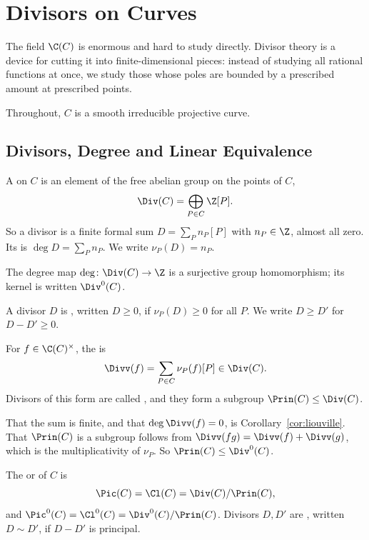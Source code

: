 \section{Divisors on Curves}\label{sec:divisors}

The field $\C(C)$ is enormous and hard to study directly. Divisor theory is a device for cutting it into finite-dimensional pieces: instead of studying all rational functions at once, we study those whose poles are bounded by a prescribed amount at prescribed points.

Throughout, $C$ is a smooth irreducible projective curve.

\subsection{Divisors, Degree and Linear Equivalence}

\begin{definition}[Divisor]
	A  on $C$ is an element of the free abelian group on the points of $C$,
	$$\Div(C) = \bigoplus_{P \in C}\Z[P].$$
	So a divisor is a finite formal sum $D = \sum_P n_P[P]$ with $n_P \in \Z$, almost all zero. Its  is $\deg D = \sum_P n_P$. We write $\nu_P(D) = n_P$.
\end{definition}

The degree map $\deg \colon \Div(C)\to\Z$ is a surjective group homomorphism; its kernel is written $\Div^0(C)$.

\begin{definition}
	A divisor $D$ is , written $D \geq 0$, if $\nu_P(D)\geq 0$ for all $P$. We write $D \geq D'$ for $D - D' \geq 0$.
\end{definition}

\begin{definition}
	For $f \in \C(C)^\times$, the  is
	$$\Divv(f) = \sum_{P \in C}\nu_P(f)[P] \in \Div(C).$$
	Divisors of this form are called , and they form a subgroup $\Prin(C) \leq \Div(C)$.
\end{definition}

That the sum is finite, and that $\deg\Divv(f) = 0$, is Corollary~\ref{cor:liouville}. That $\Prin(C)$ is a subgroup follows from $\Divv(fg) = \Divv(f) + \Divv(g)$, which is the multiplicativity of $\nu_P$. So $\Prin(C) \leq \Div^0(C)$.

\begin{definition}
	The  or  of $C$ is
	$$\Pic(C) = \Cl(C) = \Div(C)/\Prin(C),$$
	and $\Pic^0(C) = \Cl^0(C) = \Div^0(C)/\Prin(C)$. Divisors $D, D'$ are , written $D \sim D'$, if $D - D'$ is principal.
\end{definition}


